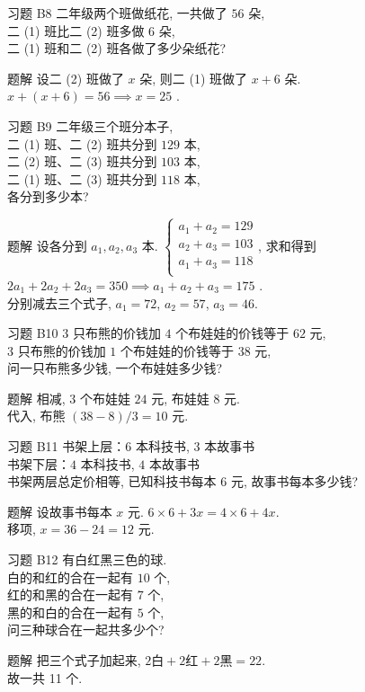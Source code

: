 \documentclass[content.tex]{subfiles}
\begin{document}
\begin{frame}{习题 B8}
二年级两个班做纸花, 一共做了 $56$ 朵, \\
二 (1) 班比二 (2) 班多做 $6$ 朵, \\
二 (1) 班和二 (2) 班各做了多少朵纸花?
\begin{exampleblock}{题解}
设二 (2) 班做了 $x$ 朵, 则二 (1) 班做了 $x + 6$ 朵. \\
$x + (x + 6) = 56\implies x = 25$ .
\end{exampleblock}
\end{frame}

\begin{frame}{习题 B9}
二年级三个班分本子, \\
二 (1) 班、二 (2) 班共分到 $129$ 本, \\
二 (2) 班、二 (3) 班共分到 $103$ 本, \\
二 (1) 班、二 (3) 班共分到 $118$ 本, \\
各分到多少本?
\begin{exampleblock}{题解}
设各分到 $a_1, a_2, a_3$ 本.
$
\begin{cases}
a_1 + a_2 = 129\\
a_2 + a_3 = 103\\
a_1 + a_3 = 118\\
\end{cases}
$, 求和得到 
$2a_1 + 2a_2 + 2a_3 = 350\implies a_1 + a_2 + a_3 = 175$ . \\
分别减去三个式子, $a_1 = 72$, $a_2 = 57$, $a_3 = 46$.
\end{exampleblock}
\end{frame}

\begin{frame}{习题 B10}
$3$ 只布熊的价钱加 $4$ 个布娃娃的价钱等于 $62$ 元, \\
$3$ 只布熊的价钱加 $1$ 个布娃娃的价钱等于 $38$ 元, \\
问一只布熊多少钱, 一个布娃娃多少钱?
\begin{exampleblock}{题解}
相减, $3$ 个布娃娃 $24$ 元, 布娃娃 $8$ 元. \\
代入, 布熊 $(38-8)/3 = 10$ 元. 
\end{exampleblock}
\end{frame}

\begin{frame}{习题 B11}
书架上层：$6$ 本科技书, $3$ 本故事书\\
书架下层：$4$ 本科技书, $4$ 本故事书\\
书架两层总定价相等, 已知科技书每本 $6$ 元, 故事书每本多少钱?
\begin{exampleblock}{题解}
设故事书每本 $x$ 元. $6\times 6 + 3x = 4\times 6 + 4x$. \\
移项, $x = 36-24 = 12$ 元.
\end{exampleblock}
\end{frame}

\begin{frame}{习题 B12}
有白红黑三色的球. \\
白的和红的合在一起有 $10$ 个, \\
红的和黑的合在一起有 $7$ 个, \\
黑的和白的合在一起有 $5$ 个, \\
问三种球合在一起共多少个?
\begin{exampleblock}{题解}
把三个式子加起来, $2\text{白} + 2\text{红} + 2\text{黑}=22$. \\
故一共 11 个.
\end{exampleblock}
\end{frame}
\end{document}
